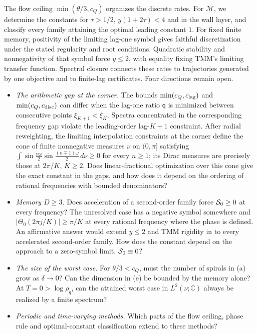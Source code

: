 \documentclass[11pt]{article}
\theoremstyle{definition}
\theoremstyle{remark}
\newcommand{\C}{\mathbb C}
\newcommand{\cM}{\mathcal M}
\newcommand{\cQ}{c_{Q}}
\newcommand{\clag}{c_{\rm lag}}\newcommand{\clayer}{c_{\rm layer}}\newcommand{\cdisc}{c_{\rm disc}}
\begin{document}
The flow ceiling \(\min(\theta/3,\cQ)\) organizes the discrete rates.
For \(\cM\), we determine the constants for \(\tau>1/2\), \(y(1+2\tau)<4\)
and in the wall layer, and classify every family attaining the optimal leading constant \(1\).
For fixed finite memory, positivity of the limiting lag-one symbol gives
faithful discretization under the stated regularity and root conditions.
Quadratic stability and nonnegativity of that symbol force \(y\le2\),
with equality fixing TMM's limiting transfer function.
Spectral closure connects these rates to trajectories generated by one
objective and to finite-lag certificates.
Four directions remain open.
\begin{itemize}
\item \emph{The arithmetic gap at the corner.}  The bounds
\(\min(\cQ,\clag)\) and \(\min(\cQ,\cdisc)\) can differ when the lag-one ratio
\(\mathsf q\) is minimized between consecutive points \(\xi_{K+1}<\xi_K\).
Spectra concentrated in the corresponding frequency gap violate the leading-order
lag-\(K+1\) constraint.  After radial reweighting, the limiting interpolation constraints at the corner
define the cone of finite nonnegative measures \(\nu\) on \((0,\pi]\) satisfying
\(\int\sin\frac{n\omega}2\sin\frac{(n\mp1)\omega}2\,d\nu\ge0\) for every \(n\ge1\);
its Dirac measures are precisely those at \(2\pi/K\), \(K\ge2\).
Does linear-fractional optimization over this cone give the exact constant in
the gaps, and how does it depend on the ordering of rational frequencies with bounded denominators?
\item \emph{Memory \(D\ge3\).}  Does acceleration of a second-order family
force \(\mathcal S_0\ge0\) at every frequency?  The unresolved case has a negative
symbol somewhere and \(|\Theta_0(2\pi j/K)|\ge\pi/K\) at every rational
frequency where the phase is defined.  An affirmative answer would extend \(y\le2\) and TMM rigidity
in  to every accelerated second-order family.
How does the constant depend on the approach to a zero-symbol limit,
\(\mathcal S_0\equiv0\)?
\item \emph{The size of the worst case.}  For \(\theta/3<\cQ\), must the
number of spirals in (a) grow as \(\delta\to0\)?  Can the
dimension in (e) be bounded by the memory alone?
At \(T=0>\log\rho_q\), can the attained worst case in \(L^2(\nu;\C)\)
always be realized by a finite spectrum?
\item \emph{Periodic and time-varying methods.}  Which parts of the flow
ceiling, phase rule and optimal-constant classification extend to these methods?
\end{itemize}
\end{document}
